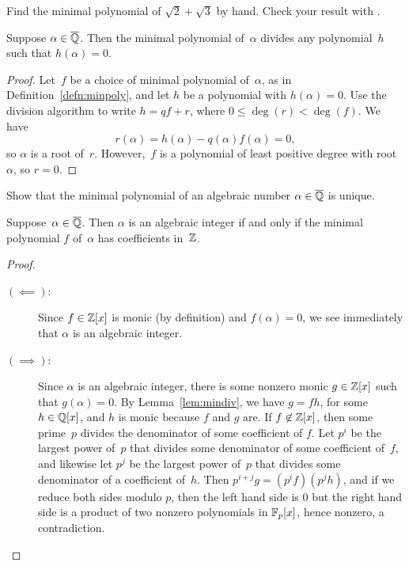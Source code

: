 \begin{exercise}
	Find the minimal polynomial of $\sqrt{2} + \sqrt{3}$ by hand.
	Check your result with \sage{}.
\end{exercise}

\begin{lemma}\label{lem:mindiv}
	Suppose $\alpha \in\overline{\mathbb{Q}}$.  Then the minimal polynomial of~$\alpha$
	divides any polynomial~$h$ such that $h(\alpha)=0$.
\end{lemma}
\begin{proof}
	Let~$f$ be a choice of minimal polynomial of~$\alpha$, as in
	Definition~\ref{defn:minpoly}, and let $h$ be a polynomial with
	$h(\alpha)=0$.  Use the division algorithm to write $h=qf + r$,
	where $0\leq \deg(r) < \deg(f)$.  We have $$r(\alpha) = h(\alpha) -
	q(\alpha) f(\alpha) = 0,$$ so $\alpha$ is a root of~$r$.
	However,~$f$ is a polynomial of least positive degree with
	root~$\alpha$, so $r=0$.
\end{proof}

\begin{exercise}
	Show that the minimal polynomial of an algebraic number
	$\alpha\in\overline{\mathbb{Q}}$ is unique.
\end{exercise}

\begin{lemma}
	\label{lem:minpolint}
	Suppose~$\alpha \in\overline{\mathbb{Q}}$. Then $\alpha$ is an algebraic integer if
	and only if the minimal polynomial $f$ of~$\alpha$ has coefficients
	in~$\mathbb{Z}$.
\end{lemma}
\begin{proof}
	\hfill
	\begin{description}
		\item[$(\impliedby)$:]
			Since $f\in \mathbb{Z}[x]$ is monic (by definition) and $f(\alpha)=0$,
			we see immediately that $\alpha$ is an algebraic integer.
		\item[$(\implies)$:]
			Since $\alpha$ is an algebraic integer, there is
			some nonzero monic $g\in\mathbb{Z}[x]$ such that $g(\alpha)=0$.
			By Lemma~\ref{lem:mindiv}, we have $g=fh$, for some $h\in\mathbb{Q}[x]$,
			and $h$ is monic because $f$ and $g$ are.  If $f\not\in\mathbb{Z}[x]$,
			then some prime~$p$ divides the denominator of some coefficient
			of $f$.  Let $p^i$ be the largest power of~$p$ that divides some 
			denominator of some coefficient of~$f$, and likewise let $p^j$ be
			the largest power of~$p$ that divides some denominator of a 
			coefficient of~$h$.  Then $p^{i+j}g = (p^if)(p^j h)$, and if we 
			reduce both sides modulo $p$, then the left hand side is $0$ but 
			the right hand side is a product of two nonzero polynomials in 
			$\mathbb{F}_p[x]$, hence nonzero, a contradiction.
	\end{description}
\end{proof}

